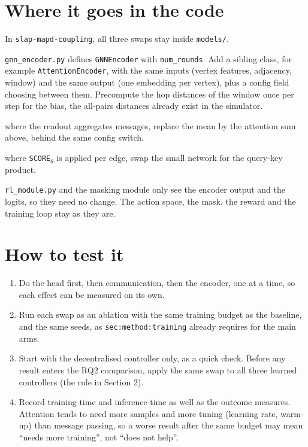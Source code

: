 \documentclass[11pt,a4paper]{article}
\begin{document}
\section{Where it goes in the code}

In \texttt{slap-mapd-coupling}, all three swaps stay inside
\texttt{models/}.
\begin{description}[leftmargin=*]
  \item[Encoder] \texttt{gnn\_encoder.py} defines \texttt{GNNEncoder} with
        \texttt{num\_rounds}. Add a sibling class, for example
        \texttt{AttentionEncoder}, with the same inputs (vertex features,
        adjacency, window) and the same output (one embedding per vertex),
        plus a config field choosing between them. Precompute the hop
        distances of the window once per step for the bias, the
        all-pairs distances already exist in the simulator.
  \item[Communication] where the readout aggregates messages, replace the
        mean by the attention sum above, behind the same config switch.
  \item[Head] where \texttt{SCORE}$_\theta$ is applied per edge, swap the
        small network for the query-key product.
  \item[Unchanged] \texttt{rl\_module.py} and the masking module only see
        the encoder output and the logits, so they need no change. The
        action space, the mask, the reward and the training loop stay as
        they are.
\end{description}

\section{How to test it}

\begin{enumerate}[leftmargin=*]
  \item Do the head first, then communication, then the encoder, one at a
        time, so each effect can be measured on its own.
  \item Run each swap as an ablation with the same training budget as the
        baseline, and the same seeds, as \texttt{sec:method:training}
        already requires for the main arms.
  \item Start with the decentralised controller only, as a quick check.
        Before any result enters the RQ2 comparison, apply the same swap to
        all three learned controllers (the rule in Section 2).
  \item Record training time and inference time as well as the outcome
        measures. Attention tends to need more samples and more tuning
        (learning rate, warm-up) than message passing, so a worse result
        after the same budget may mean ``needs more training'', not ``does
        not help''.
\end{enumerate}
\end{document}
